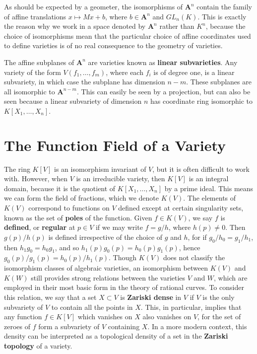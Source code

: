 As should be expected by a geometer, the isomorphisms of $\mathbf{A}^n$ contain the family of affine translations $x \mapsto Mx + b$, where $b \in \mathbf{A}^n$ and $GL_n(K)$. This is exactly the reason why we work in a space denoted by $\mathbf{A}^n$ rather than $K^n$, because the choice of isomorphisms mean that the particular choice of affine coordinates used to define varieties is of no real consequence to the geometry of varieties.

\begin{example}
    The affine subplanes of $\mathbf{A}^n$ are varieties known as {\bf linear subvarieties}. Any variety of the form $V(f_1, \dots, f_m)$, where each $f_i$ is of degree one, is a linear subvariety, in which case the subplane has dimension $n-m$. These subplanes are all isomorphic to $\mathbf{A}^{n-m}$. This can easily be seen by a projection, but can also be seen because a linear subvariety of dimension $n$ has coordinate ring isomorphic to $K[X_1, \dots, X_n]$.
\end{example}

\section{The Function Field of a Variety}

The ring $K[V]$ is an isomorphism invariant of $V$, but it is often difficult to work with. However, when $V$ is an irreducible variety, then $K[V]$ is an integral domain, because it is the quotient of $K[X_1, \dots, X_n]$ by a prime ideal. This means we can form the field of fractions, which we denote $K(V)$. The elements of $K(V)$ correspond to functions on $V$ defined except at certain singularity sets, known as the set of {\bf poles} of the function. Given $f \in K(V)$, we say $f$ is {\bf defined}, or {\bf regular} at $p \in V$ if we may write $f = g/h$, where $h(p) \neq 0$. Then $g(p)/h(p)$ is defined irrespective of the choice of $g$ and $h$, for if $g_0/h_0 = g_1/h_1$, then $h_1g_0 = h_0g_1$, and so $h_1(p)g_0(p) = h_0(p)g_1(p)$, hence $g_0(p)/g_1(p) = h_0(p)/h_1(p)$. Though $K(V)$ does not classify the isomorphism classes of algebraic varieties, an isomorphism between $K(V)$ and $K(W)$ still provides strong relations between the varieties $V$ and $W$, which are employed in their most basic form in the theory of rational curves. To consider this relation, we say that a set $X \subset V$ is {\bf Zariski dense} in $V$ if $V$ is the only subvariety of $V$ to contain all the points in $X$. This, in particular, implies that any function $f \in K[V]$ which vanishes on $X$ also vanishes on $V$, for the set of zeroes of $f$ form a subvariety of $V$ containing $X$. In a more modern context, this density can be interpreted as a topological density of a set in the {\bf Zariski topology} of a variety.

